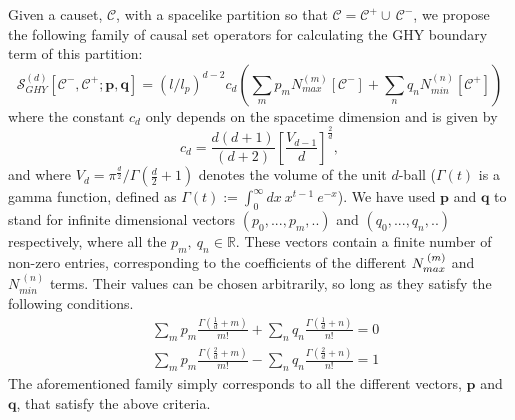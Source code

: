 \documentclass[12pt]{article}
\newcommand{\be}{\begin{equation}}
\newcommand{\ee}{\end{equation}}
\begin{document}
Given a causet, $\mathcal{C}$, with a spacelike partition so that $\mathcal C = \mathcal C^+ \cup\, \mathcal C^-$, we propose the following family of causal set operators for calculating the GHY boundary term of this partition:
\be\label{general_boundary_sum}
\mathcal{S}^{(d)}_{GHY}\left[\mathcal{C}^-,\mathcal{C}^+;\mathbf{p}, \mathbf{q} \right]= \left(l/l_p\right)^{d-2} c_{d}
\left( \sum_m p_m N_{max}^{(m)}\left[\mathcal{C}^- \right]
+  \sum_n q_n N_{min}^{(n)}\left[\mathcal{C}^+ \right]\right)
\ee
where the constant $c_{d}$ only depends on the spacetime dimension and is given by
\be\label{Cn}
c_{d}=\frac{d(d+1)}{(d+2)}\left[\frac{V_{d-1}}{d}\right]^{\frac{2}{d}},
\ee
and where $V_d=\pi^{\frac{d}{2}}/\Gamma\left(\frac{d}{2}+1\right)$ denotes the volume of the unit $d$-ball ($\Gamma(t)$ is a gamma function, defined as $\Gamma(t):=\int_0^\infty dx\: x^{t-1}\: e^{-x}$). We have used $\mathbf{p}$ and $\mathbf{q}$ to stand for infinite dimensional vectors $(p_0,...,p_m,..)$ and $(q_0,...,q_n,..)$ respectively, where all the $p_m,\: q_n \in \mathbb{R}$. These vectors contain a finite number of non-zero entries, corresponding to the coefficients of the different $N_{{max\vphantom{i}}}^{\:(m)}$ and $N_{{min}}^{\:(n)}$ terms. Their values can be chosen arbitrarily, so long as they satisfy the following conditions.
\begin{align}\label{coefficient_relation1}
& \sum_m p_m \frac{\Gamma\left(\frac{1}{d}+m \right)}{m!}  + \sum_n q_n\frac{\Gamma\left(\frac{1}{d}+n \right)}{n!}=0
\\
& \label{coefficient_relation2}\sum_m p_m \frac{\Gamma\left(\frac{2}{d}+m \right)}{m!}  - \sum_n q_n\frac{\Gamma\left(\frac{2}{d}+n \right)}{n!}=1
\end{align}
The aforementioned family simply corresponds to all the different vectors, $\mathbf{p}$ and $\mathbf{q}$, that satisfy the above criteria.
\end{document}
